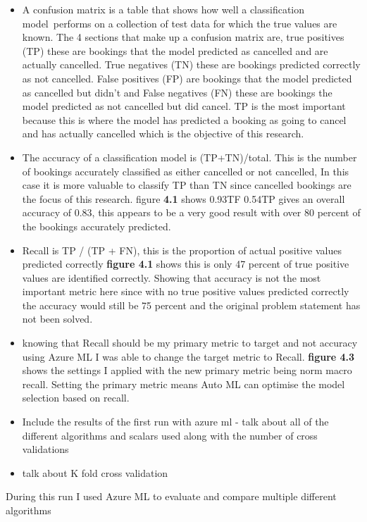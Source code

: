 \begin{itemize}
\item A confusion matrix is a table that shows how well a classification model performs on a collection of test data for which the true values are known. The 4 sections that make up a confusion matrix are, true positives (TP) these are bookings that the model predicted as cancelled and are actually cancelled. True negatives (TN) these are bookings predicted correctly as not cancelled. False positives (FP) are bookings that the model predicted as cancelled but didn't and False negatives (FN) these are bookings the model predicted as not cancelled but did cancel. TP is the most important because this is where the model has predicted a booking as going  to cancel and has actually cancelled which is the objective of this research.
\item  The accuracy of a classification model is (TP+TN)/total. This is the number of bookings accurately classified as either cancelled or not cancelled, In this case it is more valuable to classify TP than TN since cancelled bookings are the focus of this research. figure \textbf{4.1} shows  0.93TF 0.54TP gives an overall accuracy of 0.83, this appears to be a very good result with over 80 percent of the bookings accurately predicted.
\item Recall is TP / (TP + FN), this is the proportion of actual positive values predicted correctly \textbf{figure 4.1} shows this is only 47 percent of true positive values are identified correctly. Showing that accuracy is not the most important metric here since with no true positive values predicted correctly the accuracy would still be 75 percent and the original problem statement has not been solved. 
\item knowing that Recall should be my primary metric to target and not accuracy using Azure ML I was able to change the target metric to Recall. \textbf{figure 4.3} shows the settings I applied with the new primary metric being norm macro recall. Setting the primary metric means Auto ML can optimise the model selection based on recall.
\item Include the results of the first run with azure ml - talk about all of the different algorithms and scalars used along with the number of cross validations
\item talk about K fold cross validation
\end{itemize}



During this run I used Azure ML to evaluate and compare multiple different algorithms

